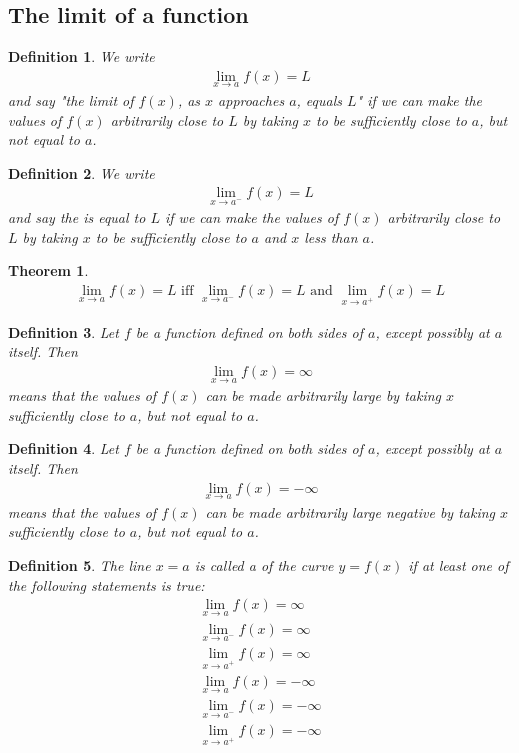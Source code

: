 \documentclass{article}
\theoremstyle{sltheorem}
\newtheorem{definition}{Definition}[section]
\newtheorem{theorem}{Theorem}[section]
\begin{document}
\subsection{The limit of a function}
\begin{definition}
    We write
    \begin{align*}
        \lim_{x\to a} f(x) = L
    \end{align*}
    and say "the limit of $f(x)$, as $x$ approaches $a$, equals $L$" if we can make the values of $f(x)$ arbitrarily close to $L$ by taking $x$ to be sufficiently close to $a$, but not equal to $a$.
\end{definition}
\begin{definition}
    We write
    \begin{align*}
        \lim_{x\to a^-}f(x) = L
    \end{align*}
    and say the  is equal to $L$ if we can make the values of $f(x)$ arbitrarily close to $L$ by taking $x$ to be sufficiently close to $a$ and $x$ less than $a$. 
\end{definition}
\begin{theorem}
    \begin{align*}
        \lim_{x\to a}f(x) = L \text{ iff } \lim_{x\to a^-}f(x) = L \text{ and } \lim_{x\to a^+}f(x) = L
    \end{align*}
\end{theorem}
\begin{definition}
    Let $f$ be a function defined on both sides of $a$, except possibly at $a$ itself. Then
    \begin{align*}
        \lim_{x\to a} f(x) = \infty
    \end{align*}
    means that the values of $f(x)$ can be made arbitrarily large by taking $x$ sufficiently close to $a$, but not equal to $a$.
\end{definition}
\begin{definition}
    Let $f$ be a function defined on both sides of $a$, except possibly at $a$ itself. Then
    \begin{align*}
        \lim_{x\to a} f(x) = -\infty
    \end{align*}
    means that the values of $f(x)$ can be made arbitrarily large negative by taking $x$ sufficiently close to $a$, but not equal to $a$.
\end{definition}
\begin{definition}
    The line $x=a$ is called a  of the curve $y=f(x)$ if at least one of the following statements is true:
    \begin{align*}
        \lim_{x\to a}f(x) = \infty\\
        \lim_{x\to a^-}f(x) = \infty\\
        \lim_{x\to a^+}f(x) = \infty\\
        \lim_{x\to a}f(x) = -\infty\\
        \lim_{x\to a^-}f(x) = -\infty\\
        \lim_{x\to a^+}f(x) = -\infty
    \end{align*}
\end{definition}
\end{document}
